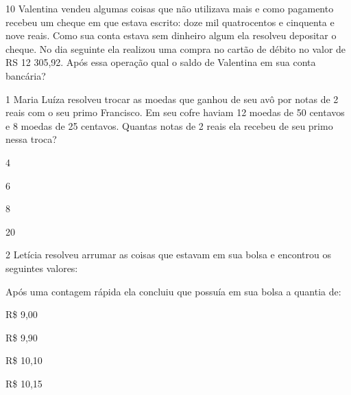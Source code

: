 
\num{10} Valentina vendeu algumas coisas que não utilizava mais e como
pagamento recebeu um cheque em que estava escrito: doze mil quatrocentos
e cinquenta e nove reais. Como sua conta estava sem dinheiro algum ela
resolveu depositar o cheque. No dia seguinte ela realizou uma compra no
cartão de débito no valor de RS 12 305,92. Após essa operação qual o
saldo de Valentina em sua conta bancária?




\num{1} Maria Luíza resolveu trocar as moedas que ganhou de seu avô por
notas de 2 reais com o seu primo Francisco. Em seu cofre haviam 12
moedas de 50 centavos e 8 moedas de 25 centavos. Quantas notas de 2
reais ela recebeu de seu primo nessa troca?

\begin{escolha}
\item
  4
\item
  6
\item
  8
\item
  20
\end{escolha}


\num{2} Letícia resolveu arrumar as coisas que estavam em sua bolsa e
encontrou os seguintes valores:


Após uma contagem rápida ela concluiu que possuía em sua bolsa a quantia
de:

\begin{escolha}
\item
  R\$ 9,00
\item
  R\$ 9,90
\item
  R\$ 10,10
\item
  R\$ 10,15
\end{escolha}

